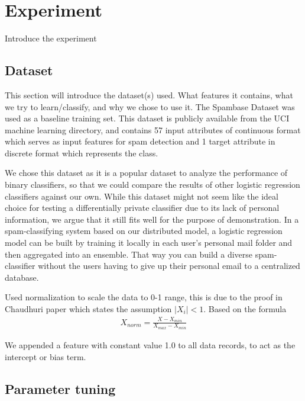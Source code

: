 
\chapter{Experiment}

Introduce the experiment

\section{Dataset}
This section will introduce the dataset(s) used. What features it contains, what we try to learn/classify, and why we chose to use it.
The Spambase Dataset \cite{spambase1999data} was used as a baseline training set. This dataset is publicly available from the UCI machine learning directory, and contains 57 input attributes of continuous format which serves as input features for spam detection and 1 target attribute in discrete format which represents the class.

We chose this dataset as it is a popular dataset to analyze the performance of binary classifiers, so that we could compare the results of other logistic regression classifiers against our own. While this dataset might not seem like the ideal choice for testing a differentially private classifier due to its lack of personal information, we argue that it still fits well for the purpose of demonstration. In a spam-classifying system based on our distributed model, a logistic regression model can be built by training it locally in each user's personal mail folder and then aggregated into an ensemble. That way you can build a diverse spam-classifier without the users having to give up their personal email to a centralized database.     

Used normalization to scale the data to 0-1 range, this is due to the proof in Chaudhuri paper which states the assumption $|X_i|< 1$. Based on the formula
\begin{eqnarray}
	X_{norm} = \frac{X-X_{min}}{X_{max} - X_{min}}
\end{eqnarray}

We appended a feature with constant value 1.0 to all data records, to act as the intercept or bias term. 

\section{Parameter tuning}

